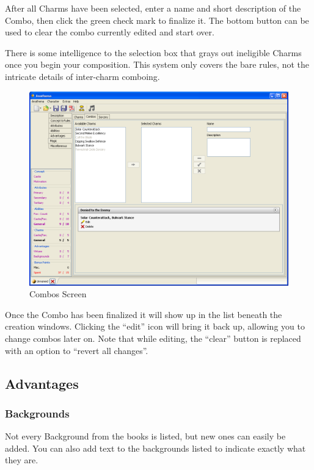 After all Charms have been selected, enter a name and short description of the Combo, then click the green check mark to finalize it. The bottom button can be used to clear the combo currently edited and start over. 

There is some intelligence to the selection box that grays out ineligible Charms once you begin your composition. This system only covers the bare rules, not the intricate details of inter-charm comboing.

\begin{figure}
	\centering
		\includegraphics[width=1.00\textwidth]{images/Combos.png}
	\caption{Combos Screen}
	\label{fig:Combos}
\end{figure}

Once the Combo has been finalized it will show up in the list beneath the creation windows. Clicking the  "`edit"' icon will bring it back up, allowing you to change combos later on. Note that while editing, the "`clear"' button is replaced with an option to "`revert all changes"'.

\subsection{Advantages}
\subsubsection{Backgrounds}
Not every Background from the books is listed, but new ones can easily be added. You can also add text to the backgrounds listed to indicate exactly what they are. 

